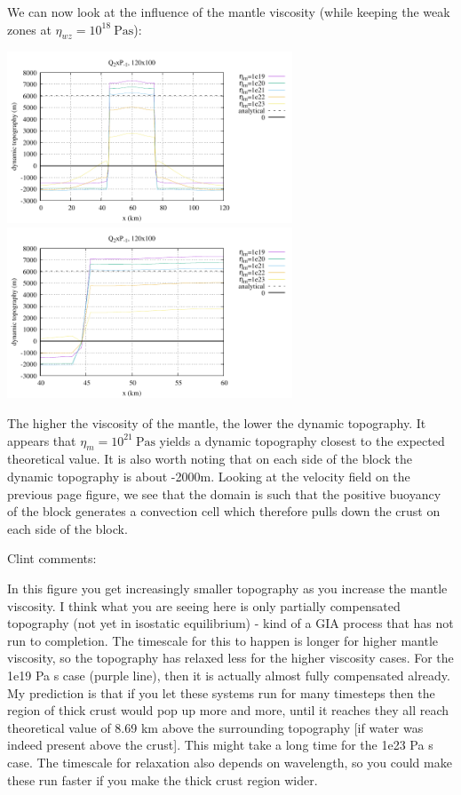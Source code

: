 We can now look at the influence of the mantle viscosity (while keeping the 
weak zones at $\eta_{wz}=10^{18}~\si{\pascal\second}$):
\begin{center}
\includegraphics[width=8.5cm]{python_codes/fieldstone_160/results/dyn_topo4a.pdf}
\includegraphics[width=8.5cm]{python_codes/fieldstone_160/results/dyn_topo4b.pdf}
\end{center}
The higher the viscosity of the mantle, the lower the dynamic topography. 
It appears that $\eta_m=10^{21}~\si{\pascal\second}$ yields a dynamic topography
closest to the expected theoretical value.
It is also worth noting that on each side of the block the dynamic topography
is about -2000m.
Looking at the velocity field on the previous page figure, we see that the domain
is such that the positive buoyancy of the block generates a convection cell which 
therefore pulls down the crust on each side of the block.

Clint comments:
\begin{displayquote}
{\color{darkgray}
In this figure you get increasingly smaller topography as you increase the mantle viscosity. 
I think what you are seeing here is only partially compensated topography (not yet in isostatic equilibrium) 
- kind of a GIA process that has not run to completion. The timescale for this to happen is longer for 
higher mantle viscosity, so the topography has relaxed less for the higher viscosity cases. 
For the 1e19 Pa s case (purple line), then it is actually almost fully compensated already. My prediction is 
that if you let these systems run for many timesteps then the region of thick crust would pop up more and more, 
until it reaches they all reach theoretical value of 8.69 km above the surrounding topography [if water was 
indeed present above the crust]. 
This might take a long time for the 1e23 Pa s case. The timescale for relaxation also depends on wavelength, 
so you could make these run faster if you make the thick crust region wider.
}
\end{displayquote}

